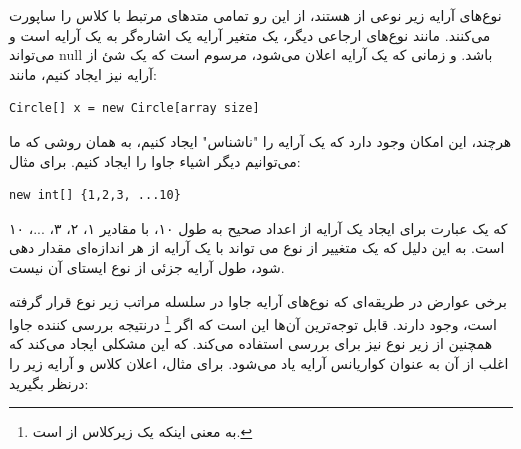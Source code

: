 \documentclass[a4paper,12pt]{report}
\newcommand{\lrm}[1]{\textcolor{steelBlue}{\lr{\texttt{#1}}}}
\begin{document}
	نوع‌های آرایه زیر نوعی از 
	\lrm{Object} 
	هستند، از این رو تمامی متد‌های مرتبط با کلاس 
	\lrm{Object} 
	را ساپورت می‌کنند.
	مانند نوع‌های ارجاعی دیگر، یک متغیر آرایه یک اشاره‌گر به یک آرایه است و می‌تواند 
	null
	باشد. و زمانی که یک آرایه اعلان می‌شود، مرسوم است که یک شئ از آرایه نیز ایجاد کنیم، مانند:
	\begin{latin}
		\small
		\begin{lstlisting}[]
			Circle[] x = new Circle[array size]
		\end{lstlisting}
	\end{latin}	
	
	هرچند، این امکان وجود دارد که یک آرایه را "ناشناس" ایجاد کنیم، به همان روشی که ما می‌توانیم دیگر اشیاء جاوا را ایجاد کنیم. برای مثال:
	\begin{latin}
		\small
		\begin{lstlisting}[]
			new int[] {1,2,3, ...10}
		\end{lstlisting}
	\end{latin}	
	
	که یک عبارت برای ایجاد یک آرایه از اعداد صحیح به طول ۱۰، با مقادیر ۱، ۲، ۳، ...، ۱۰ است.
	به این دلیل که یک متغییر از نوع 
	\lrm{T[]}
	می تواند با یک آرایه از هر اندازه‌ای مقدار دهی شود، طول آرایه جزئی از نوع ایستای آن نیست.
	
	برخی عوارض در طریقه‌ای که نوع‌های آرایه جاوا در سلسله مراتب زیر نوع قرار گرفته است، وجود دارند.
	قابل توجه‌ترین آن‌ها این است که اگر 
	\lrm{A <: B}\footnote{
	 به معنی اینکه
	\lrm{A}
	یک زیرکلاس از 
	\lrm{B} 
	است.
	}
	درنتیجه بررسی کننده جاوا همچنین از زیر نوع 
	\lrm{A[] <: B[]}
	نیز برای بررسی استفاده می‌کند.
	که این مشکلی ایجاد می‌کند که اغلب از آن به عنوان کواریانس آرایه یاد می‌شود.
	برای مثال،‌ اعلان کلاس و آرایه زیر را درنظر بگیرید:
	
\end{document}
